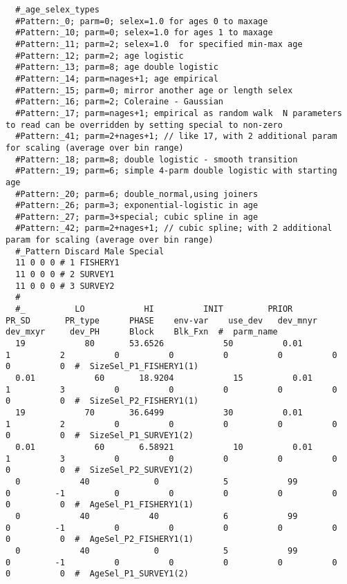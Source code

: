 \begin{landscape}
{\begin{verbatim}
  #_age_selex_types
  #Pattern:_0; parm=0; selex=1.0 for ages 0 to maxage
  #Pattern:_10; parm=0; selex=1.0 for ages 1 to maxage
  #Pattern:_11; parm=2; selex=1.0  for specified min-max age
  #Pattern:_12; parm=2; age logistic
  #Pattern:_13; parm=8; age double logistic
  #Pattern:_14; parm=nages+1; age empirical
  #Pattern:_15; parm=0; mirror another age or length selex
  #Pattern:_16; parm=2; Coleraine - Gaussian
  #Pattern:_17; parm=nages+1; empirical as random walk  N parameters to read can be overridden by setting special to non-zero
  #Pattern:_41; parm=2+nages+1; // like 17, with 2 additional param for scaling (average over bin range)
  #Pattern:_18; parm=8; double logistic - smooth transition
  #Pattern:_19; parm=6; simple 4-parm double logistic with starting age
  #Pattern:_20; parm=6; double_normal,using joiners
  #Pattern:_26; parm=3; exponential-logistic in age
  #Pattern:_27; parm=3+special; cubic spline in age
  #Pattern:_42; parm=2+nages+1; // cubic spline; with 2 additional param for scaling (average over bin range)
  #_Pattern Discard Male Special
  11 0 0 0 # 1 FISHERY1
  11 0 0 0 # 2 SURVEY1
  11 0 0 0 # 3 SURVEY2
  #
  #_          LO            HI          INIT         PRIOR         PR_SD       PR_type      PHASE    env-var    use_dev   dev_mnyr   dev_mxyr     dev_PH      Block    Blk_Fxn  #  parm_name
  19            80       53.6526            50          0.01             1          2          0          0          0          0          0          0          0  #  SizeSel_P1_FISHERY1(1)
  0.01            60       18.9204            15          0.01             1          3          0          0          0          0          0          0          0  #  SizeSel_P2_FISHERY1(1)
  19            70       36.6499            30          0.01             1          2          0          0          0          0          0          0          0  #  SizeSel_P1_SURVEY1(2)
  0.01            60       6.58921            10          0.01             1          3          0          0          0          0          0          0          0  #  SizeSel_P2_SURVEY1(2)
  0            40             0             5            99             0         -1          0          0          0          0          0          0          0  #  AgeSel_P1_FISHERY1(1)
  0            40            40             6            99             0         -1          0          0          0          0          0          0          0  #  AgeSel_P2_FISHERY1(1)
  0            40             0             5            99             0         -1          0          0          0          0          0          0          0  #  AgeSel_P1_SURVEY1(2)

\end{verbatim}}
\end{landscape}
